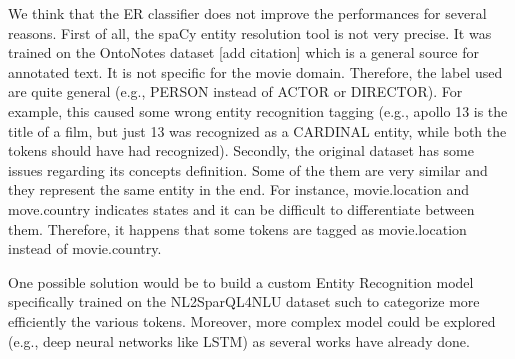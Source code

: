 \documentclass[11pt,a4paper]{article}
\begin{document}
We think that the ER classifier does not improve the performances for several reasons. First of all, the spaCy entity resolution tool is not very precise. It was trained on the OntoNotes dataset [add citation] which is a general source for annotated text. It is not specific for the movie domain. Therefore, the label used are quite general (e.g., PERSON instead of ACTOR or DIRECTOR). For example, this caused some wrong entity recognition tagging (e.g., apollo 13 is the title of a film, but just 13 was recognized as a CARDINAL entity, while both the tokens should have had recognized).
Secondly, the original dataset has some issues regarding its concepts definition. Some of the them are very similar and they represent the same entity in the end. For instance, movie.location and move.country indicates states and it can be difficult to differentiate between them. Therefore, it happens that some tokens are tagged as movie.location instead of movie.country.  

One possible solution would be to build a custom Entity Recognition model specifically trained on the NL2SparQL4NLU dataset such to categorize more efficiently the various tokens. Moreover, more complex model could be explored (e.g., deep neural networks like LSTM) as several works have already done.



\end{document}

